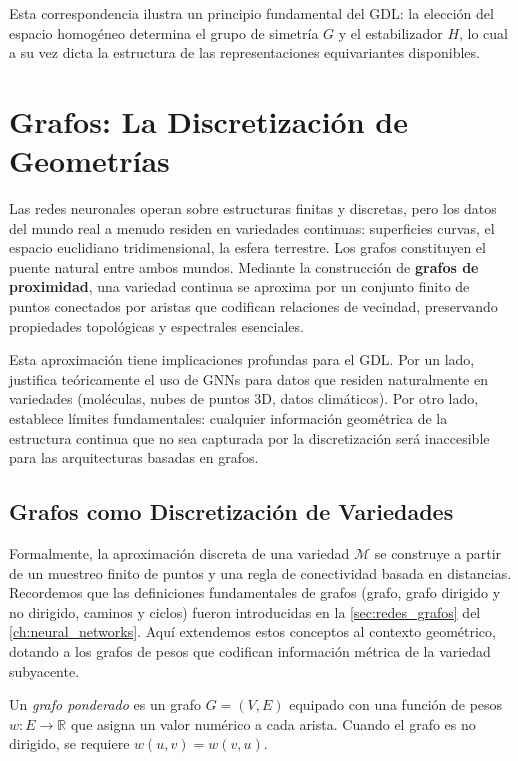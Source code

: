 \begin{remark}
	Esta correspondencia ilustra un principio fundamental del \gls{GDL}: la elección del espacio homogéneo determina el grupo de simetría $G$ y el estabilizador $H$, lo cual a su vez dicta la estructura de las representaciones equivariantes disponibles.
\end{remark}


\section{Grafos: La Discretización de Geometrías}\label{sec:grafos_discretizacion}

Las redes neuronales operan sobre estructuras finitas y discretas, pero los datos del mundo real a menudo residen en variedades continuas: superficies curvas, el espacio euclidiano tridimensional, la esfera terrestre. Los grafos constituyen el puente natural entre ambos mundos. Mediante la construcción de \textbf{grafos de proximidad}, una variedad continua se aproxima por un conjunto finito de puntos conectados por aristas que codifican relaciones de vecindad, preservando propiedades topológicas y espectrales esenciales.

Esta aproximación tiene implicaciones profundas para el \gls{GDL}. Por un lado, justifica teóricamente el uso de \glspl{GNN} para datos que residen naturalmente en variedades (moléculas, nubes de puntos 3D, datos climáticos). Por otro lado, establece límites fundamentales: cualquier información geométrica de la estructura continua que no sea capturada por la discretización será inaccesible para las arquitecturas basadas en grafos.

\subsection{Grafos como Discretización de Variedades}\label{subsec:grafos_discretizacion_variedades}

Formalmente, la aproximación discreta de una variedad $\mathcal{M}$ se construye a partir de un muestreo finito de puntos y una regla de conectividad basada en distancias. Recordemos que las definiciones fundamentales de grafos (grafo, grafo dirigido y no dirigido, caminos y ciclos) fueron introducidas en la \autoref{sec:redes_grafos} del \autoref{ch:neural_networks}. Aquí extendemos estos conceptos al contexto geométrico, dotando a los grafos de pesos que codifican información métrica de la variedad subyacente.

\begin{definition}\label{def:grafo_ponderado}
	Un \textit{grafo ponderado} es un grafo $G = (V, E)$ equipado con una función de pesos $w: E \to \mathbb{R}$ que asigna un valor numérico a cada arista. Cuando el grafo es no dirigido, se requiere $w(u,v) = w(v,u)$.
\end{definition}

